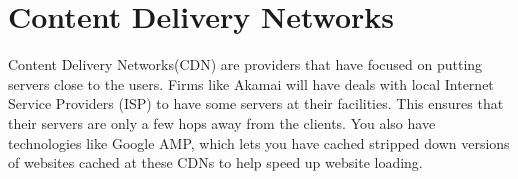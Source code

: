 

\section{Content Delivery Networks}
Content Delivery Networks(CDN) are providers that have focused on putting servers close to the users. Firms like Akamai will have deals with local Internet Service Providers (ISP) to have some servers at their facilities. This ensures that their servers are only a few hops away from the clients. You also have technologies like Google AMP, which lets you have cached stripped down versions of websites cached at these CDNs to help speed up website loading.







